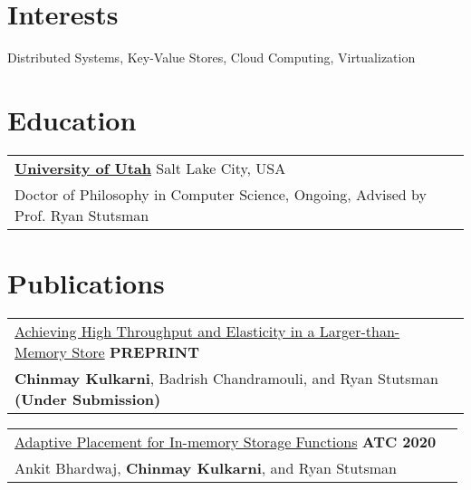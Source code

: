 \documentclass[margin,line]{res}
\begin{document}
\name{Chinmay Kulkarni (www.chinmayk.net, github.com/chinkulkarni) %
}
\begin{resume}

\section{\sc Interests}
Distributed Systems, Key-Value Stores, Cloud Computing, Virtualization

\section{\sc Education}
 \begin{tabular}{@{}p{5.5in}p{4in}}
  {\bf \href{http://www.cs.utah.edu/}{University of Utah}} \dotfill Salt Lake City,
  USA \\
 {\small Doctor of Philosophy in Computer Science, Ongoing, Advised by Prof. Ryan Stutsman}
 \end{tabular}

\section{\sc Publications}
 \begin{tabular}{@{}p{5.5in}p{4in}}
 \href{https://arxiv.org/abs/2006.03206}{Achieving High Throughput and
 Elasticity in a Larger-than-Memory Store} \hfill
 {\small\bf PREPRINT}\\
 {\small {\bf Chinmay Kulkarni}, Badrish Chandramouli, and Ryan
 Stutsman} \hfill {\small\bf (Under Submission)}\\
 \end{tabular}

 \vspace{-7pt}
 \begin{tabular}{@{}p{5.5in}p{4in}}
 \href{http://utah.systems/projects/kulkarni\_splinter}{Adaptive
 Placement for In-memory Storage Functions} \hfill
 {\small\bf ATC 2020}\\
 {\small Ankit Bhardwaj, {\bf Chinmay Kulkarni}, and Ryan Stutsman}\\
 \end{tabular}


\end{resume}
\end{document}
